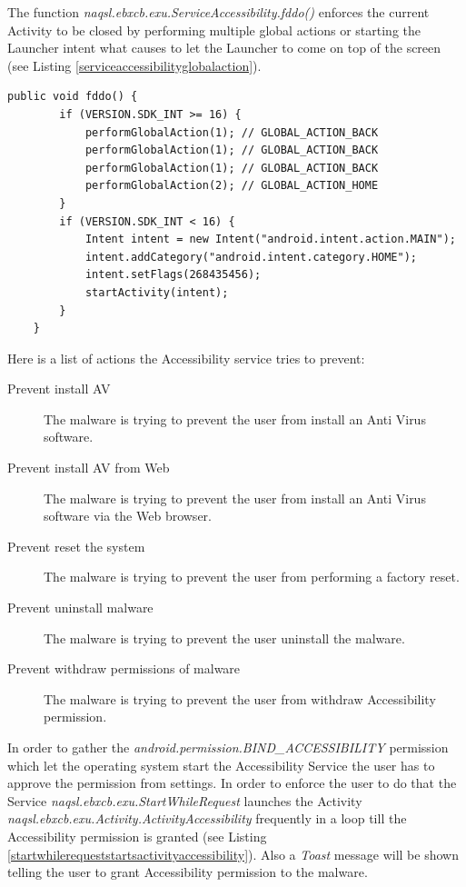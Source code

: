 \documentclass[10pt,titlepage]{article}
\begin{document}
The function \textit{naqsl.ebxcb.exu.ServiceAccessibility.fddo()} enforces the current Activity to be closed by performing multiple global actions or starting the Launcher intent what causes to let the Launcher to come on top of the screen (see Listing \ref{serviceaccessibilityglobalaction}).

\begin{lstlisting}[label=serviceaccessibilityglobalaction,caption=The function \textit{naqsl.ebxcb.exu.ServiceAccessibility.fddo()} presses three times back and then leaves the current App or calls \textit{android.app.Activity.startActivity()} using the Launcher intent in order to bring the Launcher on top of the screen.,frame=tb]
    public void fddo() {
        if (VERSION.SDK_INT >= 16) {
            performGlobalAction(1); // GLOBAL_ACTION_BACK
            performGlobalAction(1); // GLOBAL_ACTION_BACK
            performGlobalAction(1); // GLOBAL_ACTION_BACK
            performGlobalAction(2); // GLOBAL_ACTION_HOME
        }
        if (VERSION.SDK_INT < 16) {
            Intent intent = new Intent("android.intent.action.MAIN");
            intent.addCategory("android.intent.category.HOME");
            intent.setFlags(268435456);
            startActivity(intent);
        }
    }
\end{lstlisting}

Here is a list of actions the Accessibility service tries to prevent:

\begin{description}
\item[Prevent install AV] The malware is trying to prevent the user from install an Anti Virus software.
\item[Prevent install AV from Web] The malware is trying to prevent the user from install an Anti Virus software via the Web browser.
\item[Prevent reset the system] The malware is trying to prevent the user from performing a factory reset.
\item[Prevent uninstall malware] The malware is trying to prevent the user uninstall the malware.
\item[Prevent withdraw permissions of malware] The malware is trying to prevent the user from withdraw Accessibility permission.
\end{description}

In order to gather the \textit{android.permission.BIND\_ACCESSIBILITY} permission which let the operating system start the Accessibility Service the user has to approve the permission from settings. In order to enforce the user to do that the Service \textit{naqsl.ebxcb.exu.StartWhileRequest} launches the Activity \textit{naqsl.ebxcb.exu.Activity.ActivityAccessibility} frequently in a loop till the Accessibility permission is granted (see Listing \ref{startwhilerequeststartsactivityaccessibility}). Also a \textit{Toast} message will be shown telling the user to grant Accessibility permission to the malware.
\end{document}
